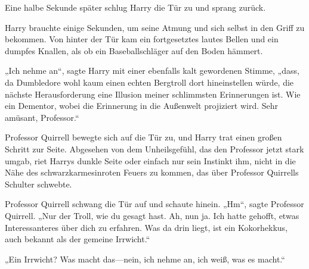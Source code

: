 \later

Eine halbe Sekunde später schlug Harry die Tür zu und sprang zurück.

Harry brauchte einige Sekunden, um seine Atmung und sich selbst in den Griff zu bekommen. Von hinter der Tür kam ein fortgesetztes lautes Bellen und ein dumpfes Knallen, als ob ein Baseballschläger auf den Boden hämmert.

„Ich nehme an“, sagte Harry mit einer ebenfalls kalt gewordenen Stimme, „dass, da Dumbledore wohl kaum einen echten Bergtroll dort hineinstellen würde, die nächste Herausforderung eine Illusion meiner schlimmsten Erinnerungen ist. Wie ein Dementor, wobei die Erinnerung in die Außenwelt projiziert wird. Sehr amüsant, Professor.“

Professor Quirrell bewegte sich auf die Tür zu, und Harry trat einen großen Schritt zur Seite. Abgesehen von dem Unheilsgefühl, das den Professor jetzt stark umgab, riet Harrys dunkle Seite oder einfach nur sein Instinkt ihm, nicht in die Nähe des schwarzkarmesinroten Feuers zu kommen, das über Professor Quirrells Schulter schwebte.

Professor Quirrell schwang die Tür auf und schaute hinein.
„Hm“, sagte Professor Quirrell.
„Nur der Troll, wie du gesagt hast. Ah, nun ja. Ich hatte gehofft, etwas Interessanteres über dich zu erfahren. Was da drin liegt, ist ein Kokorhekkus, auch bekannt als der gemeine Irrwicht.“

„Ein Irrwicht? Was macht das—nein, ich nehme an, ich weiß, was es macht.“

